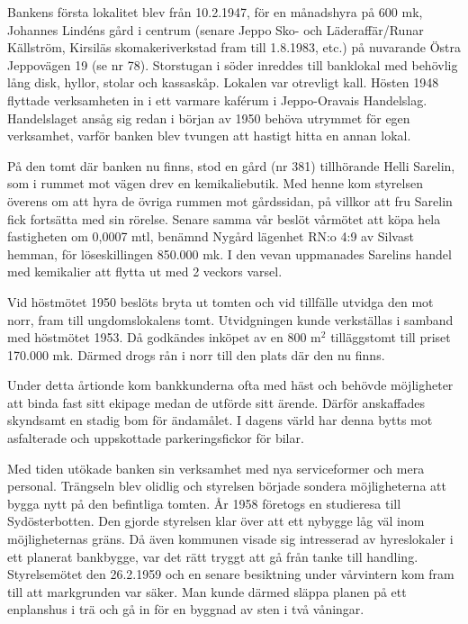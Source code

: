 Bankens första lokalitet blev från 10.2.1947, för en månadshyra på 600 mk, Johannes Lindéns gård i centrum (senare Jeppo Sko- och Läderaffär/Runar Källström, Kirsiläs skomakeriverkstad fram till 1.8.1983, etc.) på nuvarande Östra Jeppovägen 19 (se nr 78). Storstugan i söder inreddes till banklokal med behövlig lång disk, hyllor, stolar och kassaskåp. Lokalen var otrevligt kall. Hösten 1948 flyttade verksamheten in i ett varmare kaférum i Jeppo-Oravais Handelslag. Handelslaget ansåg sig redan i början av 1950 behöva utrymmet för egen verksamhet, varför banken blev tvungen att hastigt hitta en annan lokal.

På den tomt där banken nu finns, stod en gård (nr 381) tillhörande Helli Sarelin, som i rummet mot vägen drev en kemikaliebutik. Med henne kom styrelsen överens om att hyra de övriga rummen mot gårdssidan, på villkor att fru Sarelin fick fortsätta med sin rörelse. Senare samma vår beslöt vårmötet att köpa hela fastigheten om 0,0007 mtl, benämnd Nygård lägenhet RN:o 4:9 av Silvast hemman, för löseskillingen 850.000 mk. I den vevan uppmanades Sarelins handel med kemikalier att flytta ut med 2 veckors varsel.


Vid höstmötet 1950 beslöts bryta ut tomten och vid tillfälle utvidga den mot norr, fram till ungdomslokalens tomt. Utvidgningen kunde verkställas i samband med höstmötet 1953. Då godkändes inköpet av en 800 m$^2$ tilläggstomt till priset 170.000 mk. Därmed drogs rån i norr till den plats där den nu finns.

Under detta årtionde kom bankkunderna ofta med häst och behövde möjligheter att binda fast sitt ekipage medan de utförde sitt ärende. Därför anskaffades skyndsamt en stadig bom för ändamålet. I dagens värld har denna bytts mot asfalterade och uppskottade parkeringsfickor för bilar.

Med tiden utökade banken sin verksamhet med nya serviceformer och mera personal. Trängseln blev olidlig och styrelsen började sondera möjligheterna att bygga nytt på den befintliga tomten. År 1958 företogs en studieresa till Sydösterbotten. Den gjorde styrelsen klar över att ett nybygge låg väl inom möjligheternas gräns. Då även kommunen visade sig intresserad av hyreslokaler i ett planerat bankbygge, var det rätt tryggt att gå från tanke till handling. Styrelsemötet den 26.2.1959 och en senare besiktning under vårvintern kom fram till att markgrunden var säker. Man kunde därmed släppa planen på ett enplanshus i trä och gå in för en byggnad av sten i två våningar.

